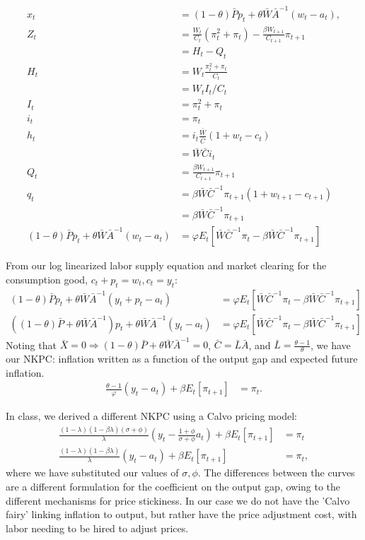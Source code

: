 \documentclass[11pt]{article} %
\begin{document}
\begin{align*}
x_t &= (1-\theta)\bar{P}p_t + \theta\bar{W}\bar{A}^{-1}(w_t - a_t),\\
Z_t &= \frac{W_{t}}{C_t}(\pi_t^2 + \pi_t) - \frac{\beta W_{t+1}}{C_{t+1}}\pi_{t+1} \\
&= H_t - Q_t \\
H_t &= W_t\frac{\pi_t^2 + \pi_t}{C_t}\\
&= W_tI_t/C_t \\
I_t &= \pi_t^2 + \pi_t\\
i_t &= \pi_t\\
h_t &= i_t\frac{\bar{W}}{\bar{C}}(1+w_t-c_t)\\
&= \bar{W}{\bar{C}}i_t\\
Q_t &=\frac{\beta W_{t+1}}{C_{t+1}}\pi_{t+1}\\
q_t &= \beta\bar{W}\bar{C}^{-1}\pi_{t+1}(1 + w_{t+1}-c_{t+1} )\\
&= \beta\bar{W}\bar{C}^{-1}\pi_{t+1}\\
(1-\theta)\bar{P}p_t + \theta\bar{W}\bar{A}^{-1}(w_t - a_t) &= \varphi E_t[ \bar{W}\bar{C}^{-1}\pi_t -  \beta\bar{W}\bar{C}^{-1}\pi_{t+1}]
\end{align*}

From our log linearized labor supply equation and market clearing for the consumption good, $c_t + p_t = w_t, c_t = y_t$:
\begin{align*}
(1-\theta)\bar{P}p_t + \theta\bar{W}\bar{A}^{-1}(y_t + p_t - a_t) &= \varphi E_t[ \bar{W}\bar{C}^{-1}\pi_t -  \beta \bar{W}\bar{C}^{-1}\pi_{t+1}]\\
((1-\theta)\bar{P} + \theta\bar{W}\bar{A}^{-1} )p_t + \theta\bar{W}\bar{A}^{-1}(y_t - a_t) &= \varphi E_t[\bar{W}\bar{C}^{-1}\pi_t -  \beta\bar{W}\bar{C}^{-1}\pi_{t+1} ]
\end{align*}
Noting that $\bar{X} = 0 \Rightarrow (1-\theta)\bar{P} + \theta\bar{W}\bar{A}^{-1} = 0$, $\bar{C} = \bar{L}\bar{A}$, and $\bar{L} = \frac{\theta - 1}{\theta}$, we have our NKPC: inflation written as a function of the output gap and expected future inflation.
\begin{align}
 \frac{\theta - 1}{\varphi}(y_t - a_t) + \beta E_t[\pi_{t+1} ] &=\pi_t. \label{NKPC}
\end{align}

In class, we derived a different NKPC using a Calvo pricing model:
\begin{align*}
\frac{(1-\lambda)(1-\beta\lambda)(\sigma + \phi)}{\lambda}\left(y_t - \frac{1+\phi}{\sigma + \phi}a_t\right) + \beta E_{t}[ \pi_{t+1}] &= \pi_t\\
\frac{(1-\lambda)(1-\beta\lambda)}{\lambda}\left(y_t -a_t\right) + \beta E_{t}[ \pi_{t+1}] &= \pi_t,
\end{align*}
where we have substituted our values of $\sigma,\phi$. The differences between the curves are a different formulation for the coefficient on the output gap, owing to the different mechanisms for price stickiness. In our case we do not have the 'Calvo fairy' linking inflation to output, but rather have the price adjustment cost, with labor needing to be hired to adjust prices.
\end{document}
